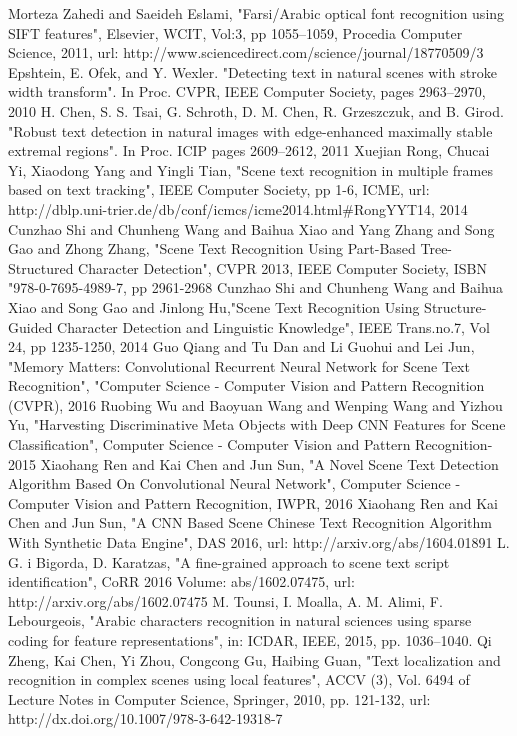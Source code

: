 \documentclass[conference]{IEEEtran}
\begin{document}
\begin{thebibliography}{1}
Morteza Zahedi and Saeideh Eslami, "Farsi/Arabic optical font recognition using {SIFT} features", Elsevier, WCIT, Vol:3, pp 1055--1059, Procedia Computer Science, 2011, url: http://www.sciencedirect.com/science/journal/18770509/3
Epshtein, E. Ofek, and Y. Wexler. "Detecting text in natural scenes with stroke width transform". In Proc. CVPR, IEEE Computer Society, pages 2963–2970, 2010
H. Chen, S. S. Tsai, G. Schroth, D. M. Chen, R. Grzeszczuk, and B. Girod. "Robust text detection in natural images with edge-enhanced maximally stable extremal regions". In Proc. ICIP pages 2609–2612, 2011
Xuejian Rong, Chucai Yi, Xiaodong Yang and Yingli Tian, "Scene text recognition in multiple frames based on text tracking",  IEEE Computer Society, pp 1-6, ICME, url: http://dblp.uni-trier.de/db/conf/icmcs/icme2014.html\#RongYYT14, 2014
Cunzhao Shi and Chunheng Wang and Baihua Xiao and Yang Zhang and Song Gao and Zhong Zhang, "Scene Text Recognition Using Part-Based Tree-Structured Character Detection", CVPR 2013, IEEE Computer Society, ISBN "978-0-7695-4989-7, pp 2961-2968
Cunzhao Shi and Chunheng Wang and Baihua Xiao and Song Gao and Jinlong Hu,"Scene Text Recognition Using Structure-Guided	Character Detection and Linguistic Knowledge", IEEE Trans.no.7, Vol 24, pp 1235-1250, 2014
Guo Qiang and Tu Dan and Li Guohui and Lei Jun, "Memory Matters: Convolutional Recurrent Neural Network for Scene Text Recognition", "Computer Science - Computer Vision and Pattern Recognition (CVPR), 2016  
Ruobing Wu and Baoyuan Wang and Wenping Wang and Yizhou Yu, "Harvesting Discriminative Meta Objects with Deep {CNN} Features for Scene Classification", Computer Science - Computer Vision and Pattern Recognition- 2015
Xiaohang Ren and Kai Chen and Jun Sun, "A Novel Scene Text Detection Algorithm Based On Convolutional Neural Network", Computer Science - Computer Vision and Pattern Recognition, IWPR, 2016
Xiaohang Ren and Kai Chen and Jun Sun, "A {CNN} Based Scene Chinese Text Recognition Algorithm With Synthetic Data Engine", DAS 2016, url: http://arxiv.org/abs/1604.01891
L. G. i Bigorda, D. Karatzas, "A fine-grained approach to scene text script identification", CoRR 2016 Volume: abs/1602.07475, url: http://arxiv.org/abs/1602.07475
M. Tounsi, I. Moalla, A. M. Alimi, F. Lebourgeois, "Arabic characters recognition in natural sciences using sparse coding for feature representations", in: ICDAR, IEEE, 2015, pp. 1036–1040.
Qi Zheng, Kai Chen, Yi Zhou, Congcong Gu, Haibing Guan, "Text localization and recognition in complex scenes using local features", ACCV (3), Vol. 6494 of Lecture Notes in Computer Science, Springer, 2010, pp. 121-132, url: http://dx.doi.org/10.1007/978-3-642-19318-7
\end{thebibliography}
\end{document}
